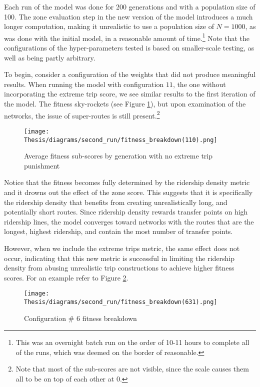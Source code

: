 \documentclass[11pt]{amsart}
\theoremstyle{definition}                  %
\theoremstyle{remark}                       %
\numberwithin{equation}{section}
\begin{document}
Each run of the model was done for 200 generations and with a population size of 100. The zone evaluation step in the new version of the model introduces a much longer computation, making it unrealistic to use a population size of $N=1000$, as was done with the initial model, in a reasonable amount of time.\footnote{This was an overnight batch run on the order of 10-11 hours to complete all of the runs, which was deemed on the border of reasonable.} Note that the configurations of the hyper-parameters tested is based on smaller-scale testing, as well as being partly arbitrary. 

To begin, consider a configuration of the weights that did not produce meaningful results. When running the model with configuration $11$, the one without incorporating the extreme trip score, we see similar results to the first iteration of the model. The fitness sky-rockets (see Figure \ref{fig:no-extreme-trips}), but upon examination of the networks, the issue of super-routes is still present.\footnote{Note that most of the sub-scores are not visible, since the scale causes them all to be on top of each other at 0.}

\begin{figure}[H]
    \centering
    \texttt{[image: Thesis/diagrams/second\_run/fitness\_breakdown(110).png]}
    \caption{Average fitness sub-scores by generation with no extreme trip punishment}
    \label{fig:no-extreme-trips}
\end{figure}

Notice that the fitness becomes fully determined by the ridership density metric and it drowns out the effect of the zone score. This suggests that it is specifically the ridership density that benefits from creating unrealistically long, and potentially short routes. Since ridership density rewards transfer points on high ridership lines, the model converges toward networks with the routes that are the longest, highest ridership, and contain the most number of transfer points. 

However, when we include the extreme trips metric, the same effect does not occur, indicating that this new metric is successful in limiting the ridership density from abusing unrealistic trip constructions to achieve higher fitness scores. For an example refer to Figure \ref{fig:631-plot}.

\begin{figure}[h]
    \centering
    \texttt{[image: Thesis/diagrams/second\_run/fitness\_breakdown(631).png]}
    \caption{Configuration \# 6 fitness breakdown}
    \label{fig:631-plot}
\end{figure}
\end{document}

